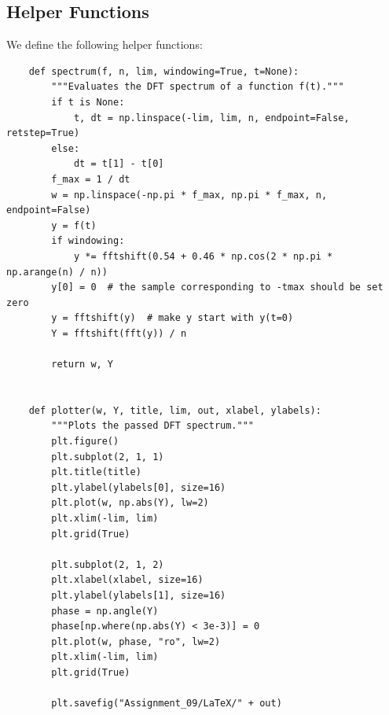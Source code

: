 \documentclass[12pt, a4paper]{article}
\begin{document}
\subsection{Helper Functions}
We define the following helper functions:
\begin{lstlisting}
    def spectrum(f, n, lim, windowing=True, t=None):
        """Evaluates the DFT spectrum of a function f(t)."""
        if t is None:
            t, dt = np.linspace(-lim, lim, n, endpoint=False, retstep=True)
        else:
            dt = t[1] - t[0]
        f_max = 1 / dt
        w = np.linspace(-np.pi * f_max, np.pi * f_max, n, endpoint=False)
        y = f(t)
        if windowing:
            y *= fftshift(0.54 + 0.46 * np.cos(2 * np.pi * np.arange(n) / n))
        y[0] = 0  # the sample corresponding to -tmax should be set zero
        y = fftshift(y)  # make y start with y(t=0)
        Y = fftshift(fft(y)) / n

        return w, Y


    def plotter(w, Y, title, lim, out, xlabel, ylabels):
        """Plots the passed DFT spectrum."""
        plt.figure()
        plt.subplot(2, 1, 1)
        plt.title(title)
        plt.ylabel(ylabels[0], size=16)
        plt.plot(w, np.abs(Y), lw=2)
        plt.xlim(-lim, lim)
        plt.grid(True)

        plt.subplot(2, 1, 2)
        plt.xlabel(xlabel, size=16)
        plt.ylabel(ylabels[1], size=16)
        phase = np.angle(Y)
        phase[np.where(np.abs(Y) < 3e-3)] = 0
        plt.plot(w, phase, "ro", lw=2)
        plt.xlim(-lim, lim)
        plt.grid(True)

        plt.savefig("Assignment_09/LaTeX/" + out)
\end{lstlisting}
\end{document}
